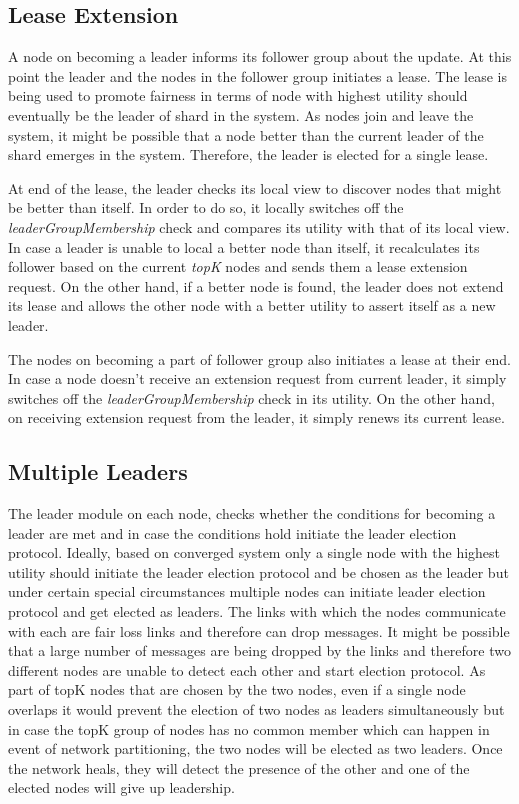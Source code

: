 \documentclass[a4paper,11pt]{kth-mag}
\begin{document}
\subsection{Lease Extension}

A node on becoming a leader informs its follower group about the update. At this point the leader and the nodes in the follower group initiates a lease. The lease is being used to promote fairness in terms of node with highest utility should eventually be the leader of shard in the system. As nodes join and leave the system, it might be possible that a node better than the current leader of the shard emerges in the system. Therefore, the leader is elected for a single lease. 

\par At end of the lease, the leader checks its local view to discover nodes that might be better than itself. In order to do so, it locally switches off the \textit{leaderGroupMembership} check and compares its utility with that of its local view. In case a leader is unable to local a better node than itself, it recalculates its follower based on the current \textit{topK} nodes and sends them a lease extension request. On the other hand, if a better node is found, the leader does not extend its lease and allows the other node with a better utility to assert itself as a new leader.

\par The nodes on becoming a part of follower group also initiates a lease at their end. In case a node doesn't receive an extension request from current leader, it simply switches off the \textit{leaderGroupMembership} check in its utility. On the other hand, on receiving extension request from the leader, it simply renews its current lease.


\subsection{Multiple Leaders}

The leader module on each node, checks whether the conditions for becoming a leader are met and in case the conditions hold initiate the leader election protocol. Ideally, based on converged system only a single node with the highest utility should initiate the leader election protocol and be chosen as the leader but under certain special circumstances multiple nodes can initiate leader election protocol and get elected as leaders. The links with which the nodes communicate with each are fair loss links and therefore can drop messages. It might be possible that a large number of messages are being dropped by the links and therefore two different nodes are unable to detect each other and start election protocol. As part of topK nodes that are chosen by the two nodes, even if a single node overlaps it would prevent the election of two nodes as leaders simultaneously but in case the topK group of nodes has no common member which can happen in event of network partitioning, the two nodes will be elected as two leaders. Once the network heals, they will detect the presence of the other and one of the elected nodes will give up leadership.
\end{document}
